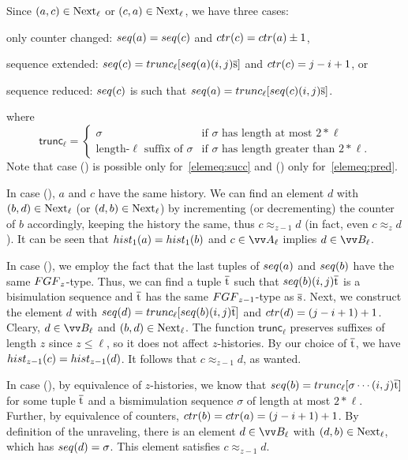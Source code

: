 \begin{proofsketch}
  Since $(a,c) \in \mathrm{Next}_{\ell}$ or $(c,a) \in \mathrm{Next}_{\ell}$, we have three cases:
  \begin{romanenumerate}
    \item only counter changed: $\seq{a} = \seq{c}$ and $\ctr{c} = \ctr{a} \pm 1$,
    \item sequence extended: $\seq{c} = \mathsf{trunc}_{\ell}[\seq{a} (i,j) \elemtuples]$ and $\ctr{c} = j-i+1$, or
    \item sequence reduced: $\seq{c}$ is such that $\seq{a} = \mathsf{trunc}_{\ell}[\seq{c} (i,j) \elemtuples]$.
  \end{romanenumerate}
  where
  \begin{displaymath}
    \mathsf{trunc}_{\ell} =
    \begin{cases}
      \sigma & \text{if $\sigma$ has length at most $2 * \ell$} \\
      \text{length-$\ell$ suffix of $\sigma$} & \text{if $\sigma$ has length greater than $2 * \ell$.}
    \end{cases}
  \end{displaymath}
  Note that case () is possible only for~\ref{elemeq:succ} and () only for~\ref{elemeq:pred}.

  In case (), $a$ and $c$ have the same history.
  We can find an element $d$ with $(b,d) \in \mathrm{Next}_{\ell}$ (or $(d,b) \in \mathrm{Next}_{\ell}$) by incrementing (or decrementing) the counter of $b$ accordingly, keeping the history the same, thus $c \approx_{z-1} d$ (in fact, even $c \approx_{z} d$).
  It can be seen that $\hist{1}{a} = \hist{1}{b}$ and $c \in \unraveldom{A}_{\ell}$ implies $d \in \unraveldom{B}_{\ell}$.

  In case (), we employ the fact that the last tuples of $\seq{a}$ and $\seq{b}$ have the same $\FGF_{z}$-type.
  Thus, we can find a tuple $\overline{\mathrm{t}}$ such that $\seq{b} (i,j) \elemtuplet$ is a bisimulation sequence and $\overline{\mathrm{t}}$ has the same $\FGF_{z-1}$-type as $\overline{\mathrm{s}}$.
  Next, we construct the element $d$ with $\seq{d} = \mathsf{trunc}_{\ell}[\seq{b}(i,j)\elemtuplet]$ and $\ctr{d} = (j-i+1) + 1$.
  Cleary, $d \in \unraveldom{B}_{\ell}$ and $(b,d) \in \mathrm{Next}_{\ell}$.
  The function $\mathsf{trunc}_{\ell}$ preserves suffixes of length $z$ since $z \le \ell$, so it does not affect $z$-histories.
  By our choice of $\overline{\mathrm{t}}$, we have $\hist{z-1}{c} = \hist{z-1}{d}$.
  It follows that $c \approx_{z-1} d$, as wanted.

  In case (), by equivalence of $z$-histories, we know that $\seq{b} = \mathsf{trunc}_{\ell}[\sigma \cdots(i,j)\elemtuplet]$ for some tuple $\overline{\mathrm{t}}$ and a bismimulation sequence $\sigma$ of length at most $2 * \ell$.
  Further, by equivalence of counters, $\ctr{b} = \ctr{a} = (j-i+1) + 1$.
  By definition of the unraveling, there is an element $d \in \unraveldom{B}_{\ell}$ with $(d,b) \in \mathrm{Next}_{\ell}$, which has $\seq{d} = \sigma$.
  This element satisfies $c \approx_{z-1} d$.
\end{proofsketch}
